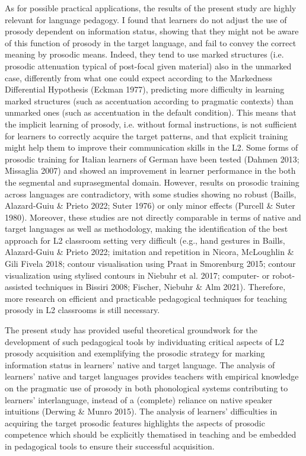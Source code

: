 \begin{styleStandard}
As for possible practical applications, the results of the present study are highly relevant for language pedagogy. I found that learners do not adjust the use of prosody dependent on information status, showing that they might not be aware of this function of prosody in the target language, and fail to convey the correct meaning by prosodic means. Indeed, they tend to use marked structures (i.e. prosodic attenuation typical of post-focal given material) also in the unmarked case, differently from what one could expect according to the Markedness Differential Hypothesis (Eckman 1977), predicting more difficulty in learning marked structures (such as accentuation according to pragmatic contexts) than unmarked ones (such as accentuation in the default condition). This means that the implicit learning of prosody, i.e. without formal instructions, is not sufficient for learners to correctly acquire the target patterns, and that explicit training might help them to improve their communication skills in the L2. Some forms of prosodic training for Italian learners of German have been tested (Dahmen 2013; Missaglia 2007) and showed an improvement in learner performance in the both the segmental and suprasegmental domain. However, results on prosodic training across languages are contradictory, with some studies showing no robust (Baills, Alazard-Guiu \& Prieto 2022; Suter 1976) or only minor effects (Purcell \& Suter 1980). Moreover, these studies are not directly comparable in terms of native and target languages as well as methodology, making the identification of the best approach for L2 classroom setting very difficult (e.g., hand gestures in Baills, Alazard-Guiu \& Prieto 2022; imitation and repetition in Nicora, McLoughlin \& Gili Fivela 2018; contour visualisation using Praat in Smorenburg 2015; contour visualization using stylised contours in Niebuhr et al. 2017; computer- or robot-assisted techniques in Bissiri 2008; Fischer, Niebuhr \& Alm 2021). Therefore, more research on efficient and practicable pedagogical techniques for teaching prosody in L2 classrooms is still necessary.
\end{styleStandard}

\begin{styleStandard}
The present study has provided useful theoretical groundwork for the development of such pedagogical tools by individuating critical aspects of L2 prosody acquisition and exemplifying the prosodic strategy for marking information status in learners’ native and target language. The analysis of learners’ native and target languages provides teachers with empirical knowledge on the pragmatic use of prosody in both phonological systems contributing to learners’ interlanguage, instead of a (complete) reliance on native speaker intuitions (Derwing \& Munro 2015). The analysis of learners’ difficulties in acquiring the target prosodic features highlights the aspects of prosodic competence which should be explicitly thematised in teaching and be embedded in pedagogical tools to ensure their successful acquisition.
\end{styleStandard}

